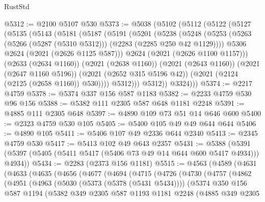 \begin{lexlean}{RustStd}
\begin{coremodule}
@5312 := @2100 @5107 @530
@5373 := @5038
    (@5102
      (@5112
        (@5122
          (@5127
            (@5135
              (@5143
                (@5181
                  (@5187
                    (@5191
                      (@5201
                        (@5238
                          (@5248
                            (@5253
                              (@5263 (@5266 (@5287 (@5310 @5312))) (@2283 (@2285 @250 @42 @1129))))
                            @5306
                            @2624
                            (@2021 (@2626 @1125 @587)))
                          @2624
                          (@2021 (@2626 @1100 @1157)))
                        (@2633 (@2634 @1160))
                        (@2021 (@2638 @1160))
                        (@2021 (@2643 @1160))
                        (@2021 (@2647 @1160 @5196))
                        (@2021 (@2652 @315 @5196 @42))
                        (@2021 (@2124 (@2125 (@2658 @1160)) @530))))
                    @5312)))
              @5312))
          @3324)))
@5374 := @2217 @4759
@5378 := @5374 @337 @156 @587 @1183
@5382 := @2233 @4759 @530 @96 @156
@5388 := @5382 @111 @2305 @587 @648 @1181 @2248
@5391 := @4885 @111 @2305 @648
@5397 := @4890 @109 @73 @51 @14 @646 @600
@5400 := @2323 @4759 @530 @105
@5405 := @5400 @105 @49 @49 @644 @644
@5406 := @4890 @105
@5411 := @5406 @107 @49 @2336 @644 @2340
@5413 := @2345 @4759 @530
@5417 := @5413 @102 @49 @643 @2357
@5431 := @5388 (@5391 (@5397 (@5405 (@5411 @5417 (@5406 @73 @49 @14 @644 @600 @5417 @4934))) @4934))
@5434 := @2283 (@2373 @156 @1181)
@5515 := @4563
    (@4589
      (@4631
        (@4633
          (@4635
            (@4656
              (@4677
                (@4694
                  (@4715
                    (@4726
                      (@4730
                        (@4757
                          (@4862
                            (@4951
                              (@4963
                                (@5030 (@5373 (@5378 (@5431 @5434))))
                                (@5374
                                  @350
                                  @156
                                  @587
                                  @1194
                                  (@5382
                                    @349
                                    @2305
                                    @587
                                    @1193
                                    @1181
                                    @2248
                                    (@4885
                                      @349
                                      @2305

\end{coremodule}
\end{lexlean}
